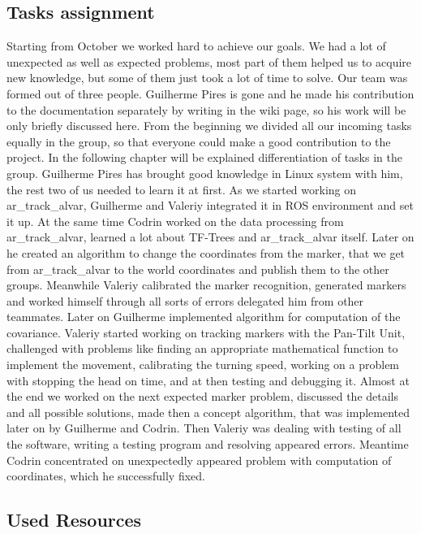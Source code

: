 \subsection{Tasks assignment}

Starting from October we worked hard to achieve our goals. We had a lot of unexpected as well as expected problems, most part of them helped us to acquire new knowledge, but some of them just took a lot of time to solve. Our team was formed out of three people. Guilherme Pires is gone and he made his contribution to the documentation separately by writing in the wiki page, so his work will be only briefly discussed here. From the beginning we divided all our incoming tasks equally in the group, so that everyone could make a good contribution to the project. In the following chapter will be explained differentiation of tasks in the group. Guilherme Pires has brought good knowledge in Linux system with him, the rest two of us needed to learn it at first. As we started working on ar\_track\_alvar, Guilherme and Valeriy integrated it in ROS environment and set it up. At the same time Codrin worked on the data processing from ar\_track\_alvar, learned a lot about TF-Trees and ar\_track\_alvar itself. Later on he created an algorithm to change the coordinates from the marker, that we get from ar\_track\_alvar to the world coordinates and publish them to the other groups. Meanwhile Valeriy calibrated the marker recognition, generated markers and worked himself through all sorts of errors delegated him from other teammates. Later on Guilherme implemented algorithm for computation of the covariance. Valeriy started working on tracking markers with the Pan-Tilt Unit, challenged with problems like finding an appropriate mathematical function to implement the movement, calibrating the turning speed, working on a problem with stopping the head on time, and at then testing and debugging it. Almost at the end we worked on the next expected marker problem, discussed the details and all possible solutions, made then a concept algorithm, that was implemented later on by Guilherme and Codrin. Then Valeriy was dealing with testing of all the software, writing a testing program and resolving appeared errors.  Meantime Codrin concentrated on unexpectedly appeared problem with computation of coordinates, which he successfully fixed.  

\subsection{Used Resources} 

